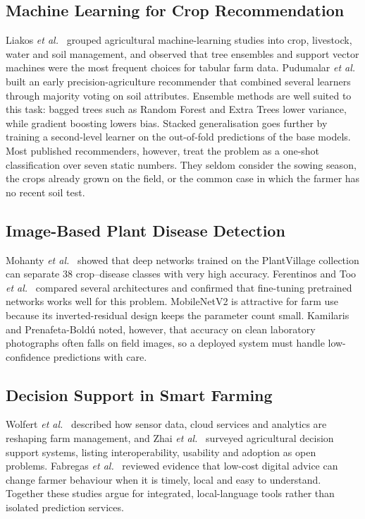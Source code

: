 \documentclass[conference]{IEEEtran}
\begin{document}
\subsection{Machine Learning for Crop Recommendation}
Liakos \emph{et al.}\ \cite{liakos2018} grouped agricultural machine-learning studies into crop, livestock, water and soil management, and observed that tree ensembles and support vector machines were the most frequent choices for tabular farm data. Pudumalar \emph{et al.}\ \cite{pudumalar2017} built an early precision-agriculture recommender that combined several learners through majority voting on soil attributes. Ensemble methods are well suited to this task: bagged trees such as Random Forest \cite{breiman2001} and Extra Trees \cite{geurts2006} lower variance, while gradient boosting \cite{friedman2001} lowers bias. Stacked generalisation \cite{wolpert1992} goes further by training a second-level learner on the out-of-fold predictions of the base models. Most published recommenders, however, treat the problem as a one-shot classification over seven static numbers. They seldom consider the sowing season, the crops already grown on the field, or the common case in which the farmer has no recent soil test.

\subsection{Image-Based Plant Disease Detection}
Mohanty \emph{et al.}\ \cite{mohanty2016} showed that deep networks trained on the PlantVillage collection \cite{hughes2015} can separate 38 crop--disease classes with very high accuracy. Ferentinos \cite{ferentinos2018} and Too \emph{et al.}\ \cite{too2019} compared several architectures and confirmed that fine-tuning pretrained networks works well for this problem. MobileNetV2 \cite{sandler2018} is attractive for farm use because its inverted-residual design keeps the parameter count small. Kamilaris and Prenafeta-Bold\'u \cite{kamilaris2018} noted, however, that accuracy on clean laboratory photographs often falls on field images, so a deployed system must handle low-confidence predictions with care.

\subsection{Decision Support in Smart Farming}
Wolfert \emph{et al.}\ \cite{wolfert2017} described how sensor data, cloud services and analytics are reshaping farm management, and Zhai \emph{et al.}\ \cite{zhai2020} surveyed agricultural decision support systems, listing interoperability, usability and adoption as open problems. Fabregas \emph{et al.}\ \cite{fabregas2019} reviewed evidence that low-cost digital advice can change farmer behaviour when it is timely, local and easy to understand. Together these studies argue for integrated, local-language tools rather than isolated prediction services.
\end{document}
